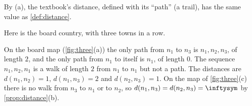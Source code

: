 \begin{remark}
By (a), the textbook's distance, defined with its ``path'' (a trail), has the
same value as \cref{def:distance}.
\end{remark}

\plain Here is the board country, with three towns in a row.

\begin{example}\label{ex:boardpaths}
On the board map (\cref{fig:three}(a)) the only path from $n_1$ to $n_3$ is
$n_1,n_2,n_3$, of length $2$, and the only path from $n_1$ to itself is $n_1$,
of length $0$. The sequence $n_1,n_2,n_1$ is a walk of length $2$ from $n_1$
to $n_1$ but not a path. The distances are $d(n_1,n_2)=1$, $d(n_1,n_3)=2$ and
$d(n_2,n_3)=1$. On the map of \cref{fig:three}(c) there is no walk from $n_3$
to $n_1$ or to $n_2$, so $d(n_1,n_3)=d(n_2,n_3)=\inftysym$ by
\cref{prop:distance}(b).
\end{example}
